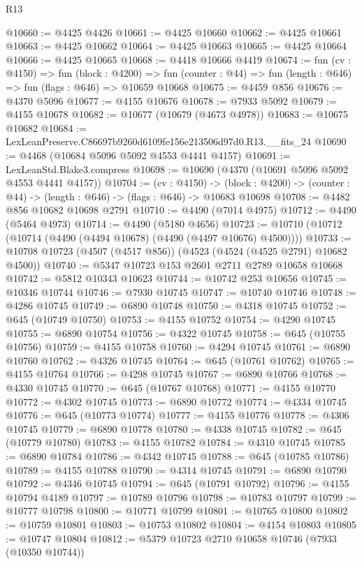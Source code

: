 \begin{lexlean}{R13}
\begin{coremodule}
@10660 := @4425 @4426
@10661 := @4425 @10660
@10662 := @4425 @10661
@10663 := @4425 @10662
@10664 := @4425 @10663
@10665 := @4425 @10664
@10666 := @4425 @10665
@10668 := @4418 @10666 @4419
@10674 := fun (cv : @4150) =>
  fun (block : @4200) =>
  fun (counter : @44) => fun (length : @646) => fun (flags : @646) => @10659 @10668
@10675 := @4459 @856
@10676 := @4370 @5096
@10677 := @4155 @10676
@10678 := @7933 @5092
@10679 := @4155 @10678
@10682 := @10677 (@10679 (@4673 @4978))
@10683 := @10675 @10682
@10684 := LexLeanPreserve.C86697b9260d6109fe156e213506d97d0.R13.__fits_24
@10690 := @4468 (@10684 @5096 @5092 @4553 @4441 @4157)
@10691 := LexLeanStd.Blake3.compress
@10698 := @10690 (@4370 (@10691 @5096 @5092 @4553 @4441 @4157))
@10704 := (cv : @4150) ->
  (block : @4200) -> (counter : @44) -> (length : @646) -> (flags : @646) -> @10683 @10698
@10708 := @4482 @856 @10682 @10698 @2791
@10710 := @4490 (@7014 @4975)
@10712 := @4490 (@5464 @4973)
@10714 := @4490 (@5180 @4656)
@10723 := @10710 (@10712 (@10714 (@4490 (@4494 @10678) (@4490 (@4497 @10676) @4500))))
@10733 := @10708 @10723 (@4507 (@4517 @856)) (@4523 (@4524 (@4525 @2791) @10682 @4500))
@10740 := @5347 @10723 @153 @2601 @2711 @2789 @10658 @10668
@10742 := @5812 @10343 @10623
@10744 := @10742 @253 @10656
@10745 := @10346 @10744
@10746 := @7930 @10745
@10747 := @10740 @10746
@10748 := @4286 @10745
@10749 := @6890 @10748
@10750 := @4318 @10745
@10752 := @645 (@10749 @10750)
@10753 := @4155 @10752
@10754 := @4290 @10745
@10755 := @6890 @10754
@10756 := @4322 @10745
@10758 := @645 (@10755 @10756)
@10759 := @4155 @10758
@10760 := @4294 @10745
@10761 := @6890 @10760
@10762 := @4326 @10745
@10764 := @645 (@10761 @10762)
@10765 := @4155 @10764
@10766 := @4298 @10745
@10767 := @6890 @10766
@10768 := @4330 @10745
@10770 := @645 (@10767 @10768)
@10771 := @4155 @10770
@10772 := @4302 @10745
@10773 := @6890 @10772
@10774 := @4334 @10745
@10776 := @645 (@10773 @10774)
@10777 := @4155 @10776
@10778 := @4306 @10745
@10779 := @6890 @10778
@10780 := @4338 @10745
@10782 := @645 (@10779 @10780)
@10783 := @4155 @10782
@10784 := @4310 @10745
@10785 := @6890 @10784
@10786 := @4342 @10745
@10788 := @645 (@10785 @10786)
@10789 := @4155 @10788
@10790 := @4314 @10745
@10791 := @6890 @10790
@10792 := @4346 @10745
@10794 := @645 (@10791 @10792)
@10796 := @4155 @10794 @4189
@10797 := @10789 @10796
@10798 := @10783 @10797
@10799 := @10777 @10798
@10800 := @10771 @10799
@10801 := @10765 @10800
@10802 := @10759 @10801
@10803 := @10753 @10802
@10804 := @4154 @10803
@10805 := @10747 @10804
@10812 := @5379 @10723 @2710 @10658 @10746 (@7933 (@10350 @10744))

\end{coremodule}
\end{lexlean}
